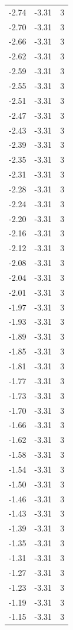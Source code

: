 \begin{longtable}{lrr}
  -2.74 & -3.31 & 3 \\
  -2.70 & -3.31 & 3 \\
  -2.66 & -3.31 & 3 \\
  -2.62 & -3.31 & 3 \\
  -2.59 & -3.31 & 3 \\
  -2.55 & -3.31 & 3 \\
  -2.51 & -3.31 & 3 \\
  -2.47 & -3.31 & 3 \\
  -2.43 & -3.31 & 3 \\
  -2.39 & -3.31 & 3 \\
  -2.35 & -3.31 & 3 \\
  -2.31 & -3.31 & 3 \\
  -2.28 & -3.31 & 3 \\
  -2.24 & -3.31 & 3 \\
  -2.20 & -3.31 & 3 \\
  -2.16 & -3.31 & 3 \\
  -2.12 & -3.31 & 3 \\
  -2.08 & -3.31 & 3 \\
  -2.04 & -3.31 & 3 \\
  -2.01 & -3.31 & 3 \\
  -1.97 & -3.31 & 3 \\
  -1.93 & -3.31 & 3 \\
  -1.89 & -3.31 & 3 \\
  -1.85 & -3.31 & 3 \\
  -1.81 & -3.31 & 3 \\
  -1.77 & -3.31 & 3 \\
  -1.73 & -3.31 & 3 \\
  -1.70 & -3.31 & 3 \\
  -1.66 & -3.31 & 3 \\
  -1.62 & -3.31 & 3 \\
  -1.58 & -3.31 & 3 \\
  -1.54 & -3.31 & 3 \\
  -1.50 & -3.31 & 3 \\
  -1.46 & -3.31 & 3 \\
  -1.43 & -3.31 & 3 \\
  -1.39 & -3.31 & 3 \\
  -1.35 & -3.31 & 3 \\
  -1.31 & -3.31 & 3 \\
  -1.27 & -3.31 & 3 \\
  -1.23 & -3.31 & 3 \\
  -1.19 & -3.31 & 3 \\
  -1.15 & -3.31 & 3 \\

\end{longtable}
